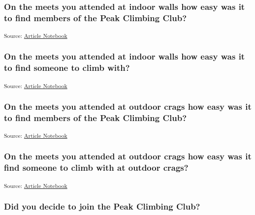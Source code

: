 \documentclass[
  letterpaper,
  DIV=11,
  numbers=noendperiod]{scrartcl}
\begin{document}
\subsubsection{On the meets you attended at indoor walls how easy was it
to find members of the Peak Climbing
Club?}\label{on-the-meets-you-attended-at-indoor-walls-how-easy-was-it-to-find-members-of-the-peak-climbing-club}

\textsubscript{Source:
\href{https://slackline.github.io/pcc-new-member-survey/index.qmd.html}{Article
Notebook}}

\subsubsection{On the meets you attended at indoor walls how easy was it
to find someone to climb
with?}\label{on-the-meets-you-attended-at-indoor-walls-how-easy-was-it-to-find-someone-to-climb-with}

\textsubscript{Source:
\href{https://slackline.github.io/pcc-new-member-survey/index.qmd.html}{Article
Notebook}}

\subsubsection{On the meets you attended at outdoor crags how easy was
it to find members of the Peak Climbing
Club?}\label{on-the-meets-you-attended-at-outdoor-crags-how-easy-was-it-to-find-members-of-the-peak-climbing-club}

\textsubscript{Source:
\href{https://slackline.github.io/pcc-new-member-survey/index.qmd.html}{Article
Notebook}}

\subsubsection{On the meets you attended at outdoor crags how easy was
it find someone to climb with at outdoor
crags?}\label{on-the-meets-you-attended-at-outdoor-crags-how-easy-was-it-find-someone-to-climb-with-at-outdoor-crags}

\textsubscript{Source:
\href{https://slackline.github.io/pcc-new-member-survey/index.qmd.html}{Article
Notebook}}

\subsubsection{Did you decide to join the Peak Climbing
Club?}\label{did-you-decide-to-join-the-peak-climbing-club}
\end{document}
